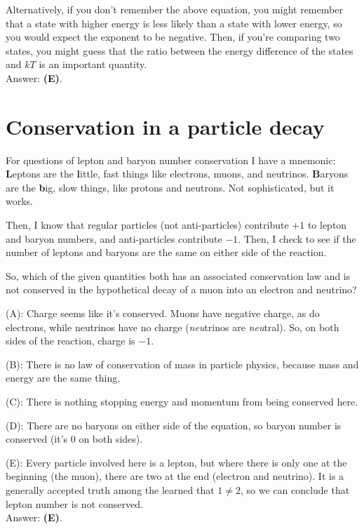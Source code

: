 \documentclass[11pt]{paper}
\newcommand{\answer}[1]{Answer: \textbf{(#1)}.}
\begin{document}
Alternatively, if you don't remember the above equation, you might remember that a state with higher energy is less likely than a state with lower energy, so you would expect the exponent to be negative.  Then, if you're comparing two states, you might guess that the ratio between the energy difference of the states and $kT$ is an important quantity.\\

\answer{E}

\section{Conservation in a particle decay}

For questions of lepton and baryon number conservation I have a mnemonic:  \textbf{L}eptons are the \textbf{l}ittle, fast things like electrons, muons, and neutrinos.  \textbf{B}aryons are the \textbf{b}ig, slow things, like protons and neutrons.  Not sophisticated, but it works.

Then, I know that regular particles (not anti-particles) contribute $+1$ to lepton and baryon numbers, and anti-particles contribute $-1$.  Then, I check to see if the number of leptons and baryons are the same on either side of the reaction.

So, which of the given quantities both has an associated conservation law and is not conserved in the hypothetical decay of a muon into an electron and neutrino?

(A): Charge seems like it's conserved.  Muons have negative charge, as do electrons, while neutrinos have no charge (\emph{neu}trinos are \emph{neu}tral).  So, on both sides of the reaction, charge is $-1$.

(B): There is no law of conservation of mass in particle physics, because mass and energy are the same thing.

(C): There is nothing stopping energy and momentum from being conserved here.

(D): There are no baryons on either side of the equation, so baryon number is conserved (it's $0$ on both sides).

(E): Every particle involved here is a lepton, but where there is only one at the beginning (the muon), there are two at the end (electron and neutrino).  It is a generally accepted truth among the learned that $1\neq2$, so we can conclude that lepton number is not conserved.\\

\answer{E}
\end{document}
